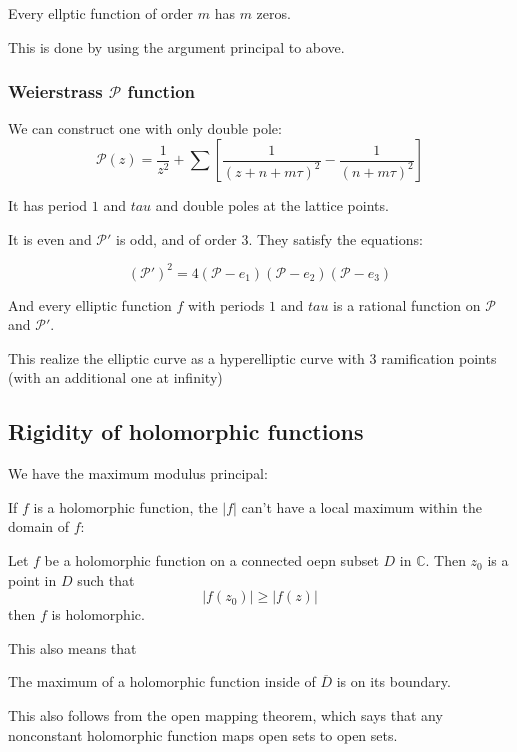 \documentclass[main.tex]{subfiles}
\begin{document}
\begin{theorem}
Every ellptic function of order $m$ has $m$ zeros.
\end{theorem}

This is done by using the argument principal to above.

\subsubsection{Weierstrass $\mathcal{P}$ function}

We can construct one with only double pole:
$$
\mathcal{P}(z) = \frac{1}{z^2} + \sum [\frac{1}{(z + n + m \tau)^2} - \frac{1}{(n + m\tau)^2}]
$$

It has period $1$ and $tau$ and double poles at the lattice points.

It is even and $\mathcal{P}'$ is odd, and of order $3$. They satisfy the equations:

\begin{theorem}
$$
(\mathcal{P}')^2 = 4(\mathcal{P} - e_1)(\mathcal{P} - e_2)(\mathcal{P} - e_3)
$$
\end{theorem}
And every elliptic function $f$ with periods $1$ and $tau$ is a rational function on $\mathcal{P}$ and $\mathcal{P'}$.

This realize the elliptic curve as a hyperelliptic curve with 3 ramification points (with an additional one at infinity)
\subsection{Rigidity of holomorphic functions}

We have the maximum modulus principal:

If $f$ is a holomorphic function, the $|f|$ can't have a local maximum within the domain of $f$:

\begin{theorem}
Let $f$ be a holomorphic function on a connected oepn subset $D$ in $\mathbb{C}$. Then $z_0$ is a point in $D$ such that 
$$
|f(z_0)| \geq |f(z)|
$$
then $f$ is holomorphic.
\end{theorem}
This also means that 

\begin{corollary}
The maximum of a holomorphic function inside of $\overline{D}$ is on its boundary.
\end{corollary}
This also follows from the open mapping theorem, which says that any nonconstant holomorphic function maps open sets to open sets.
\end{document}
